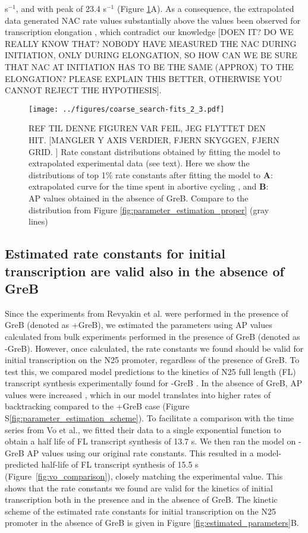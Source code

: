 s$^{-1}$, and with peak of 23.4 s$^{-1}$ (Figure
\ref{fig:extrap_and_GreB_minus_fit}A). As a consequence, the extrapolated data generated  NAC rate values substantially above
the values been observed for transcription elongation
\cite{revyakin_abortive_2006}, which contradict our knowledge [DOEN IT? DO WE REALLY KNOW THAT?  NOBODY HAVE MEASURED THE NAC DURING INITIATION, ONLY DURING ELONGATION, SO HOW CAN WE BE SURE THAT NAC AT INITIATION HAS TO BE THE SAME (APPROX) TO THE ELONGATION? PLEASE EXPLAIN THIS BETTER, OTHERWISE YOU CANNOT REJECT THE HYPOTHESIS]. 


\begin{figure}
	\begin{center}
      \texttt{[image: ../figures/coarse\_search-fits\_2\_3.pdf]}
	\end{center}
    \caption{REF TIL DENNE FIGUREN VAR FEIL, JEG FLYTTET DEN HIT.  [MANGLER Y AXIS VERDIER, FJERN SKYGGEN, FJERN GRID. ]
      Rate constant distributions obtained by fitting the model to
      extrapolated experimental data (see text). 
      Here we show the distributions of top 1\% rate constants after fitting the model to \textbf{A}:
      extrapolated curve for the time spent in abortive
      cycling \cite{revyakin_abortive_2006}, and \textbf{B}:  AP values obtained in the
      absence of GreB. Compare to the distribution from Figure \ref{fig:parameter_estimation_proper} (gray lines)}
      \label{fig:extrap_and_GreB_minus_fit}
\end{figure}

\subsection{Estimated rate constants for initial transcription are valid also
in the absence of GreB}
Since the experiments from Revyakin et al. were performed in the presence of
GreB (denoted as +GreB), we estimated the parameters using AP values calculated from bulk experiments performed
in the presence of GreB (denoted as -GreB). However, once calculated, the rate constants we found should be valid for initial
transcription on the N25 promoter, regardless of the presence of
GreB. To test this, we
compared model predictions to the kinetics of N25 full length (FL) transcript
synthesis experimentally found for -GreB \cite{vo_vitro_2003-1}. In the
absence of GreB, AP values were increased \cite{hsu_initial_2006}, which in our model
translates into higher rates of backtracking compared to the +GreB case (Figure
S\ref{fig:parameter_estimation_scheme}). To facilitate a comparison with the
time series from Vo et al., we fitted their data to a single exponential
function to obtain a half life of FL transcript synthesis of 13.7 s. We then
ran the model on -GreB AP values using our original rate constants. This resulted in a model-predicted half-life of
FL transcript synthesis of 15.5 s (Figure~\ref{fig:vo_comparison}), closely
matching the experimental value. This shows that the rate constants we found are valid for the kinetics of initial
transcription both in the presence and in the absence of GreB. The kinetic
scheme of the estimated rate constants for initial transcription on the N25
promoter in the absence of GreB is given in Figure
\ref{fig:estimated_parameters}B.

